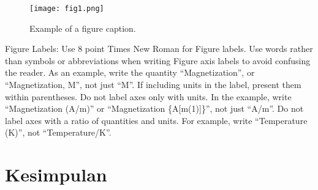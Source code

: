 \documentclass[conference]{IEEEtran}
\begin{document}
\begin{figure}[htbp]
\centerline{\texttt{[image: fig1.png]}}
\caption{Example of a figure caption.}
\label{fig}
\end{figure}

Figure Labels: Use 8 point Times New Roman for Figure labels. Use words 
rather than symbols or abbreviations when writing Figure axis labels to 
avoid confusing the reader. As an example, write the quantity 
``Magnetization'', or ``Magnetization, M'', not just ``M''. If including 
units in the label, present them within parentheses. Do not label axes only 
with units. In the example, write ``Magnetization (A/m)'' or ``Magnetization 
\{A[m(1)]\}'', not just ``A/m''. Do not label axes with a ratio of 
quantities and units. For example, write ``Temperature (K)'', not 
``Temperature/K''.

\section{Kesimpulan}
\section*{}


\end{document}
